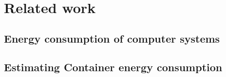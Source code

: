 \chapter{Related work} %
\label{Chapter2}

\section{Energy consumption of computer systems}
\section{}
\section{Estimating Container energy consumption}